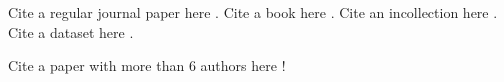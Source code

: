 \documentclass[11pt]{article}
\begin{document}
\par Cite a regular journal paper here \citep{Wang-2020-Stomatal-Optimality}. Cite a book here \citep{tyree2002xylem}. Cite an incollection here \citep{Rouse-1973-NDVI}. Cite a dataset here \citep{CliMA-Land-Code, Wang-2020-Stomatal-Optimality}.
\par Cite a paper with more than 6 authors here \citep{Clark-2011-JULES}!




\end{document}

